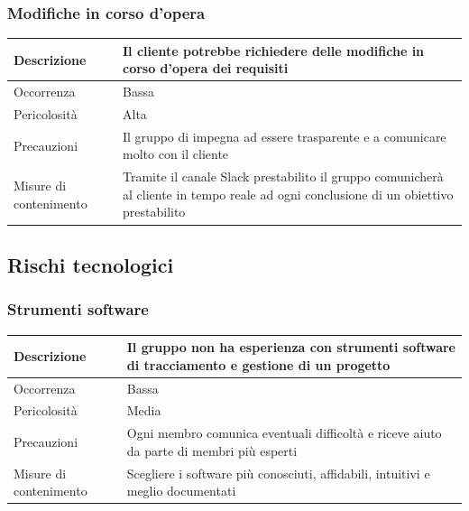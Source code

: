 \documentclass{article}
\begin{document}
\subsubsection{Modifiche in corso d'opera}
\begin{center}
\begin{tabular}{|P{10em}| P{20em}|} 
\hline
     Descrizione & Il cliente potrebbe richiedere delle modifiche in corso d'opera dei requisiti\\ 
     \hline
    Occorrenza & Bassa\\
    \hline
    Pericolosità & Alta \\
    \hline
    Precauzioni & Il gruppo di impegna ad essere trasparente e a comunicare molto con il cliente \\
    \hline
    Misure di contenimento & Tramite il canale Slack prestabilito il gruppo comunicherà al cliente in tempo reale ad ogni conclusione di un obiettivo prestabilito \\
    \hline
\end{tabular}
\label{tab:modifiche}
\end{center}

\subsection{Rischi tecnologici}
\subsubsection{Strumenti software}
\begin{center}
\begin{tabular}{|P{10em} |P{20em}|} 
\hline
     Descrizione & Il gruppo non ha esperienza con strumenti software di tracciamento e gestione di un progetto\\ 
     \hline
    Occorrenza & Bassa\\
    \hline
    Pericolosità & Media \\
    \hline
    Precauzioni & Ogni membro comunica eventuali difficoltà e riceve aiuto da parte di membri più esperti \\
    \hline
    Misure di contenimento & Scegliere i software più conosciuti, affidabili, intuitivi e meglio documentati \\
    \hline
\end{tabular}
\label{tab:sofrware}
\end{center}
\end{document}
